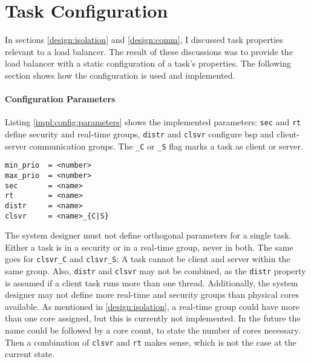 \pagebreak
\section{Task Configuration}
\label{impl:config}

In sections \ref{design:isolation} and \ref{design:comm}, I discussed
task properties relevant to a load balancer.
The result of these discussions was to provide the load balancer with a static
configuration of a task's properties.
The following section shows how the configuration is used and implemented.

\paragraph{Configuration Parameters}
Listing \ref{impl:config:parameters} shows the implemented parameters:
\texttt{sec} and \texttt{rt} define security and real-time groups,
\texttt{distr} and \texttt{clsvr} configure \gls{bsp} and client-server
communication groups.
The \texttt{\_C} or \texttt{\_S} flag marks a task as client or server.

\begin{lstlisting}[language={[5.2]Lua}, caption={Implemented set of
configuration parameters.},label={impl:config:parameters}]
min_prio  = <number>
max_prio  = <number>
sec       = <name>
rt        = <name>
distr     = <name>
clsvr     = <name>_{C|S}
\end{lstlisting}

The system designer must not define orthogonal parameters for
a single task.
Either a task is in a security or in a real-time group, never in both.
The same goes for \texttt{clsvr\_C} and \texttt{clsvr\_S}:
A task cannot be client and server within the same group.
Also, \texttt{distr} and \texttt{clsvr} may not be combined, as the
\texttt{distr} property is assumed if a client task runs more than one thread.
Additionally, the system designer may not define more real-time and security
groups than physical cores available.
As mentioned in \ref{design:isolation}, a real-time group could have more than
one core assigned, but this is currently not implemented.
In the future the name could be followed by a core count, to state the number
of cores necessary.
Then a combination of \texttt{clsvr} and \texttt{rt} makes sense, which is not
the case at the current state.

